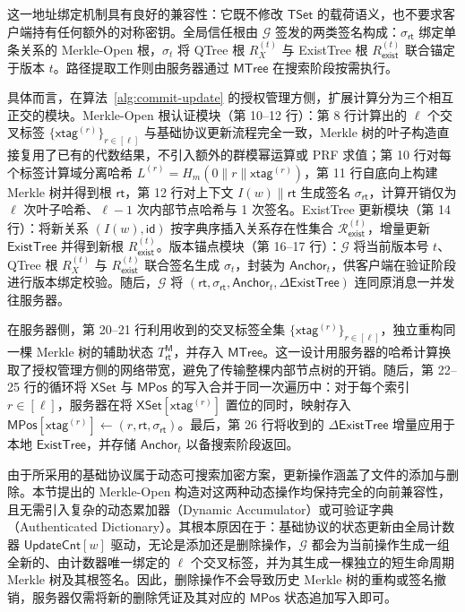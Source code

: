 这一地址绑定机制具有良好的兼容性：它既不修改 $\mathsf{TSet}$ 的载荷语义，也不要求客户端持有任何额外的对称密钥。全局信任根由 $\mathcal{G}$ 签发的两类签名构成：$\sigma_{\mathsf{rt}}$ 绑定单条关系的 Merkle-Open 根，$\sigma_t$ 将 QTree 根 $R_X^{(t)}$ 与 ExistTree 根 $R_{\mathsf{exist}}^{(t)}$ 联合锚定于版本 $t$。路径提取工作则由服务器通过 $\mathsf{MTree}$ 在搜索阶段按需执行。

具体而言，在算法~\ref{alg:commit-update} 的授权管理方侧，扩展计算分为三个相互正交的模块。Merkle-Open 根认证模块（第 10--12 行）：第 8 行计算出的 $\ell$ 个交叉标签 $\{\mathsf{xtag}^{(r)}\}_{r\in[\ell]}$ 与基础协议更新流程完全一致，Merkle 树的叶子构造直接复用了已有的代数结果，不引入额外的群模幂运算或 PRF 求值；第 10 行对每个标签计算域分离哈希 $L^{(r)}=H_m(0\|r\|\mathsf{xtag}^{(r)})$，第 11 行自底向上构建 Merkle 树并得到根 $\mathsf{rt}$，第 12 行对上下文 $I(w)\|\mathsf{rt}$ 生成签名 $\sigma_{\mathsf{rt}}$，计算开销仅为 $\ell$ 次叶子哈希、$\ell-1$ 次内部节点哈希与 1 次签名。ExistTree 更新模块（第 14 行）：将新关系 $(I(w),\mathsf{id})$ 按字典序插入关系存在性集合 $\mathcal{R}_{\mathsf{exist}}^{(t)}$，增量更新 $\mathsf{ExistTree}$ 并得到新根 $R_{\mathsf{exist}}^{(t)}$。版本锚点模块（第 16--17 行）：$\mathcal{G}$ 将当前版本号 $t$、QTree 根 $R_X^{(t)}$ 与 $R_{\mathsf{exist}}^{(t)}$ 联合签名生成 $\sigma_t$，封装为 $\mathsf{Anchor}_t$，供客户端在验证阶段进行版本绑定校验。随后，$\mathcal{G}$ 将 $(\mathsf{rt},\sigma_{\mathsf{rt}},\mathsf{Anchor}_t,\Delta\mathsf{ExistTree})$ 连同原消息一并发往服务器。

在服务器侧，第 20--21 行利用收到的交叉标签全集 $\{\mathsf{xtag}^{(r)}\}_{r\in[\ell]}$，独立重构同一棵 Merkle 树的辅助状态 $T_{\mathsf{rt}}^{\mathsf{M}}$，并存入 $\mathsf{MTree}$。这一设计用服务器的哈希计算换取了授权管理方侧的网络带宽，避免了传输整棵内部节点树的开销。随后，第 22--25 行的循环将 $\mathsf{XSet}$ 与 $\mathsf{MPos}$ 的写入合并于同一次遍历中：对于每个索引 $r\in[\ell]$，服务器在将 $\mathsf{XSet}[\mathsf{xtag}^{(r)}]$ 置位的同时，映射存入 $\mathsf{MPos}[\mathsf{xtag}^{(r)}]\leftarrow(r,\mathsf{rt},\sigma_{\mathsf{rt}})$。最后，第 26 行将收到的 $\Delta\mathsf{ExistTree}$ 增量应用于本地 $\mathsf{ExistTree}$，并存储 $\mathsf{Anchor}_t$ 以备搜索阶段返回。

由于所采用的基础协议属于动态可搜索加密方案，更新操作涵盖了文件的添加与删除。本节提出的 Merkle-Open 构造对这两种动态操作均保持完全的向前兼容性，且无需引入复杂的动态累加器（Dynamic Accumulator）或可验证字典（Authenticated Dictionary）。其根本原因在于：基础协议的状态更新由全局计数器 $\mathsf{UpdateCnt}[w]$ 驱动，无论是添加还是删除操作，$\mathcal{G}$ 都会为当前操作生成一组全新的、由计数器唯一绑定的 $\ell$ 个交叉标签，并为其生成一棵独立的短生命周期 Merkle 树及其根签名。因此，删除操作不会导致历史 Merkle 树的重构或签名撤销，服务器仅需将新的删除凭证及其对应的 $\mathsf{MPos}$ 状态追加写入即可。

